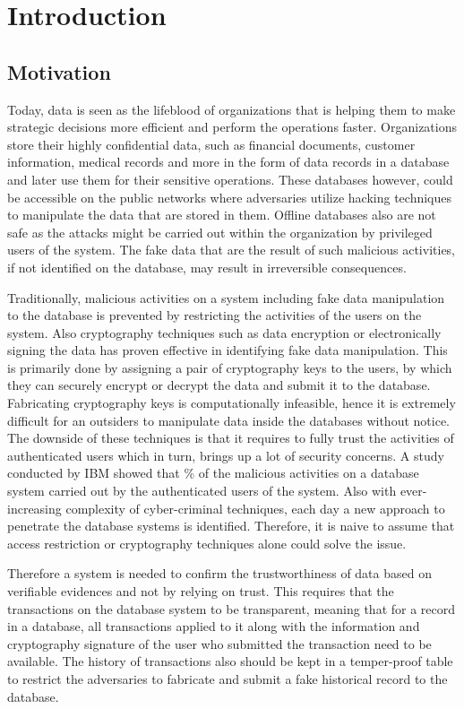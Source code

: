 \chapter{Introduction}
\label{chap:introduction}

\section{Motivation}
Today, data is seen as the lifeblood of organizations that is helping them to make strategic decisions more efficient and perform the operations faster. Organizations store their highly confidential data, such as financial documents, customer information, medical records and more in the form of data records in a database and later use them for their sensitive operations. These databases however, could be accessible on the public networks where adversaries utilize hacking techniques to manipulate the data that are stored in them. Offline databases also are not safe as the attacks might be carried out within the organization by privileged users of the system. The fake data that are the result of such malicious activities, if not identified on the database, may result in irreversible consequences.

Traditionally, malicious activities on a system including fake data manipulation to the database is prevented by restricting the activities of the users on the system. Also cryptography techniques such as data encryption or electronically signing the data has proven effective in identifying fake data manipulation. This is primarily done by assigning a pair of cryptography keys to the users, by which they can securely encrypt or decrypt the data and submit it to the database. Fabricating cryptography keys is computationally infeasible, hence it is extremely difficult for an outsiders to manipulate data inside the databases without notice. The downside of these techniques is that it requires to fully trust the activities of authenticated users which in turn, brings up a lot of security concerns. A study conducted by IBM showed that \% of the malicious activities on a database system carried out by the authenticated users of the system. Also with ever-increasing complexity of cyber-criminal techniques, each day a new approach to penetrate the database systems is identified. Therefore, it is naive to assume that access restriction or cryptography techniques alone could solve the issue. 

Therefore a system is needed to confirm the trustworthiness of data based on verifiable evidences and not by relying on trust. This requires that the transactions on the database system to be transparent, meaning that for a record in a database, all transactions applied to it along with the information and cryptography signature of the user who submitted the transaction need to be available. The history of transactions also should be kept in a temper-proof table to restrict the adversaries to fabricate and submit a fake historical record to the database.

